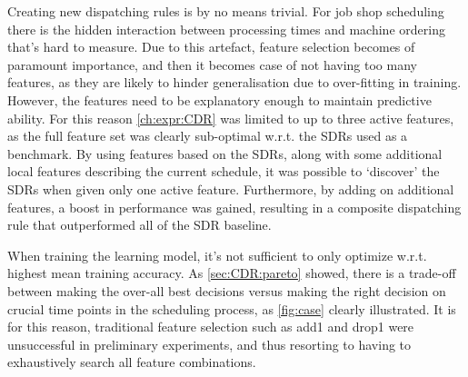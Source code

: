 \documentclass[smallextended]{svjour3}
\begin{document}
	Creating new dispatching rules is by no means trivial. For job shop scheduling there is the hidden interaction between processing times and machine ordering that's hard to measure. Due to this artefact, feature selection becomes of paramount importance, and then it becomes case of not having too many features, as they are likely to hinder generalisation due to over-fitting in training. However, the features need to be explanatory enough to maintain predictive ability. For this reason \cref{ch:expr:CDR} was limited to up to three active features, as the full feature set was clearly sub-optimal w.r.t. the SDRs used as a benchmark. By using features based on the SDRs, along with some additional local features describing the current schedule, it was possible to `discover' the SDRs when given only one active feature. %
	Furthermore, by adding on additional features, a boost in performance was gained, resulting in a composite dispatching rule that outperformed all of the SDR baseline. 
	
	When training the learning model, it's not sufficient to only optimize w.r.t. highest mean training accuracy. As \cref{sec:CDR:pareto} showed, there is a trade-off between making the over-all best decisions versus making the right decision on crucial time points in the scheduling process, as \cref{fig:case} clearly illustrated. It is for this reason, traditional feature selection such as add1 and drop1 were unsuccessful in preliminary experiments, and thus resorting to having to exhaustively search all feature combinations.
	
	
	
	  
	
	
	
\end{document}
